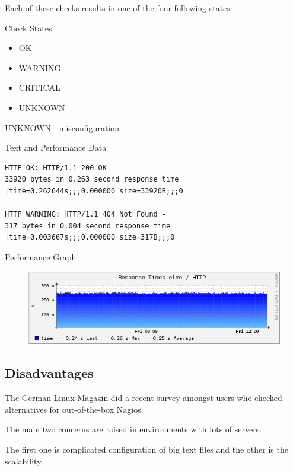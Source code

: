 Each of these checks results in one of the four
following states:

\begin{frame}[fragile]{Check States}

\begin{itemize}
\item OK
\item WARNING 
\item CRITICAL
\item UNKNOWN
\end{itemize}
\end{frame}

UNKNOWN - misconfiguration

\begin{frame}[fragile]{Text and Performance Data}
\begin{lstlisting}
HTTP OK: HTTP/1.1 200 OK -
33920 bytes in 0.263 second response time
|time=0.262644s;;;0.000000 size=33920B;;;0

HTTP WARNING: HTTP/1.1 404 Not Found - 
317 bytes in 0.004 second response time 
|time=0.003667s;;;0.000000 size=317B;;;0
\end{lstlisting}
\end{frame}

\begin{frame}{Performance Graph}
\begin{figure}
\includegraphics[width=\textwidth]{images/perfdata.png}
\end{figure}
\end{frame}

\subsection{Disadvantages}

The German Linux Magazin did a recent survey amongst users
who checked alternatives for out-of-the-box Nagios.

The main two concerns are raised in environments with lots
of servers.

The first one is complicated configuration of big text files
and the other is the scalability.

